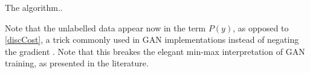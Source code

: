 \documentclass[a4paper]{article}
\newcommand{\disc}{\delta} %
\newcommand{\TrainingIndexes}{\mathcal{T}}
\newcommand{\UnseenIndexes}{\mathcal{U}}
\begin{document}
\begin{algorithm}
\end{algorithm}%
The algorithm..

Note that the unlabelled data appear now in the term $P(y)$, as opposed to
\eqref{discCost}, a trick commonly used in GAN implementations instead of
negating the gradient \cite{Goodfellow,Zaremba,Chintala,Pix2pix}. Note that
this breakes the elegant min-max interpretation of GAN training, as presented
in the literature.
\end{document}
